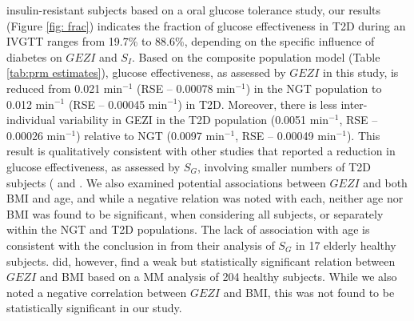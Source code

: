 \documentclass[utf8]{frontiersSCNS} %
\begin{document}
insulin-resistant subjects based on a oral glucose tolerance study, our results (Figure \ref{fig: frac}) indicates the fraction of glucose effectiveness in T2D during an IVGTT ranges from 19.7\% to 88.6\%, depending on the specific influence of diabetes on $GEZI$ and $S_I$.  
Based on the composite population model (Table \ref{tab:prm estimates}), glucose effectiveness, as assessed by $GEZI$ in this study, is reduced from 0.021 min$^{-1}$ (RSE – 0.00078 min$^{-1}$) in the NGT population to 0.012 min$^{-1}$ (RSE – 0.00045 min$^{-1}$) in T2D. Moreover, there is less inter-individual variability in GEZI in the T2D population (0.0051 min$^{-1}$, RSE – 0.00026 min$^{-1}$) relative to NGT (0.0097 min$^{-1}$, RSE – 0.00049 min$^{-1}$). This result is qualitatively consistent with other studies that reported a reduction in glucose effectiveness, as assessed by $S_G$, involving smaller numbers of T2D subjects (\citet{welch_1990} and \citet{ataru_1992}. We also examined potential associations between $GEZI$ and both BMI and age, and while a negative relation was noted with each, neither age nor BMI was found to be significant, when considering all subjects, or separately within the NGT and T2D populations. The lack of association with age is consistent with the conclusion in \citet{pacini_1998} from their analysis of $S_G$ in 17 elderly healthy subjects. \citet{Morettini_2019} did, however, find a weak but statistically significant relation between $GEZI$ and BMI based on a MM analysis of 204 healthy subjects. While we also noted a negative correlation between $GEZI$ and BMI, this was not found to be statistically significant in our study.
\end{document}
